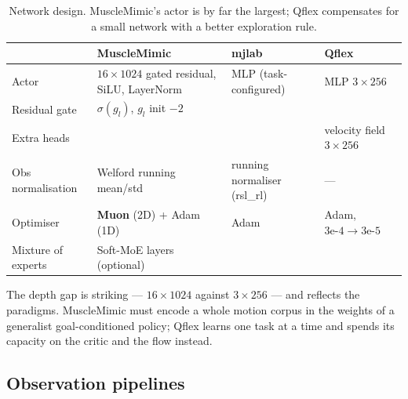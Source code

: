 \documentclass[11pt,a4paper]{article}
\newcommand{\na}{\textemdash}
\begin{document}
\begin{table}[h!]
\centering
\footnotesize
\begin{tabular}{@{}lL{3.1cm}L{3.1cm}L{3.4cm}@{}}
\toprule
 & \textcolor{mmC}{MuscleMimic} & \textcolor{mjC}{mjlab} & \textcolor{qfC}{Qflex} \\
\midrule
Actor & $16\times1024$ gated residual, SiLU, LayerNorm & MLP (task-configured) & MLP $3\times256$ \\
Residual gate & $\sigma(g_l)$, $g_l$ init $-2$ & \na & \na \\
Extra heads & \na & \na & velocity field $3\times256$ \\
Obs normalisation & Welford running mean/std & running normaliser (rsl\_rl) & --- \\
Optimiser & \textbf{Muon} (2D) + Adam (1D) & Adam & Adam, $3\text{e-}4 \to 3\text{e-}5$ \\
Mixture of experts & Soft-MoE layers (optional) & \na & \na \\
\bottomrule
\end{tabular}
\caption{Network design. MuscleMimic's actor is by far the largest; Qflex compensates
for a small network with a better exploration rule.}
\end{table}

\noindent
The depth gap is striking --- $16\times1024$ against $3\times256$ --- and reflects the
paradigms. MuscleMimic must encode a whole motion corpus in the weights of a generalist
goal-conditioned policy; Qflex learns one task at a time and spends its capacity on the
critic and the flow instead.

\subsection{Observation pipelines}
\label{sec:obs}
\end{document}
